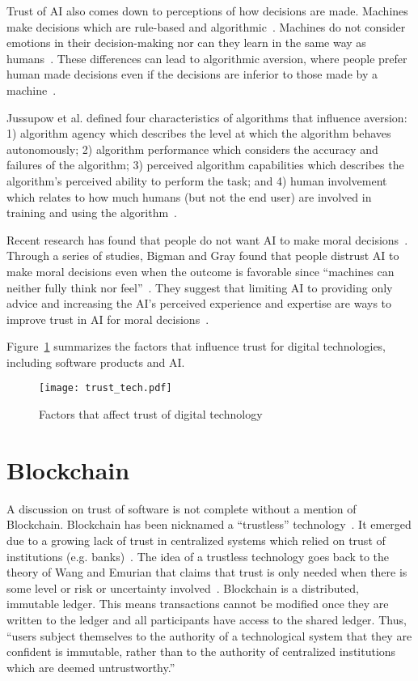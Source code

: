 \documentclass{article}
\begin{document}
Trust of AI also comes down to perceptions of how decisions are made. Machines make decisions which are rule-based and algorithmic~\cite{dietvorst2015algorithm}. Machines do not consider emotions in their decision-making nor can they learn in the same way as humans~\cite{cuzzolin2020knowing}. These differences can lead to algorithmic aversion, where people prefer human made decisions even if the decisions are inferior to those made by a machine~\cite{jussupow2020we}. 

Jussupow et al. defined four characteristics of algorithms that influence aversion: 1) algorithm agency which describes the level at which the algorithm behaves autonomously; 2) algorithm performance which considers the accuracy and failures of the algorithm; 3) perceived algorithm capabilities which describes the algorithm's perceived ability to perform the task; and 4) human involvement which relates to how much humans (but not the end user) are involved in training and using the algorithm~\cite{jussupow2020we}.

Recent research has found that people do not want AI to make moral decisions~\cite{bigman2018people}. Through a series of studies, Bigman and Gray found that people distrust AI to make moral decisions even when the outcome is favorable since ``machines can neither fully think nor feel''~\cite{bigman2018people}. 
They suggest that limiting AI to providing only advice and increasing the AI's perceived experience and expertise are ways to improve trust in AI for moral decisions~\cite{bigman2018people}. 

Figure~\ref{fig:trust_tech} summarizes the factors that influence trust for digital technologies, including software products and AI.

\begin{figure}
    \centering
    \texttt{[image: trust\_tech.pdf]}
    \caption{Factors that affect trust of digital technology}
    \label{fig:trust_tech}
\end{figure}

\section{Blockchain}
A discussion on trust of software is not complete without a mention of Blockchain. Blockchain has been nicknamed a ``trustless'' technology~\cite{vidan2019mine,hawlitschek2018limits}. It emerged due to a growing lack of trust in centralized systems which relied on trust of institutions (e.g. banks)~\cite{de2020blockchain}. The idea of a trustless technology goes back to the theory of Wang and Emurian that claims that trust is only needed  when there is some level or risk or uncertainty involved~\cite{wang2005overview}. Blockchain is a distributed, immutable ledger. This means transactions cannot be modified once they are written to the ledger and all participants have access to the shared ledger. Thus, ``users subject themselves to the authority of a technological system that they are confident is immutable, rather than to the authority of centralized institutions which are deemed untrustworthy.''~\cite{de2020blockchain}
\end{document}
